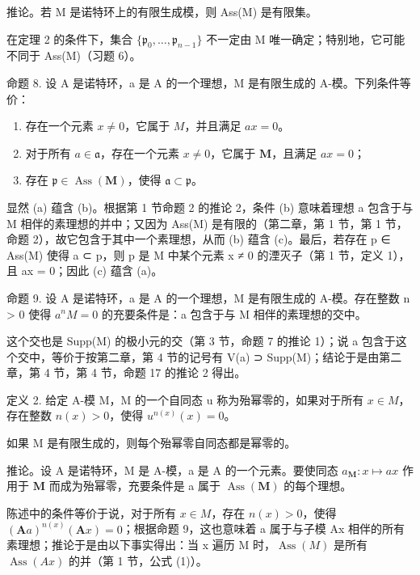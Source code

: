 推论。若 M 是诺特环上的有限生成模，则 Ass(M) 是有限集。

在定理 2 的条件下，集合 \(\{\mathfrak{p}_0,\ldots ,\mathfrak{p}_{n - 1}\}\) 不一定由 M 唯一确定；特别地，它可能不同于 Ass(M)（习题 6）。

命题 8. 设 A 是诺特环，a 是 A 的一个理想，M 是有限生成的 A-模。下列条件等价：

\begin{enumerate}
\def\labelenumi{(\alph{enumi})}
\item
存在一个元素 \(x \neq 0\)，它属于 \(M\)，并且满足 \(ax = 0\)。
\item
对于所有 \(a \in \mathfrak{a}\)，存在一个元素 \(x \neq 0\)，它属于 \(\mathbf{M}\)，且满足 \(ax = 0\)；
\item
  存在 \(\mathfrak{p} \in \operatorname{Ass}(\mathbf{M})\)，使得 \(\mathfrak{a} \subset \mathfrak{p}\)。
\end{enumerate}

显然 (a) 蕴含 (b)。根据第 1 节命题 2 的推论 2，条件 (b) 意味着理想 a 包含于与 M 相伴的素理想的并中；又因为 Ass(M) 是有限的（第二章，第 1 节，第 1 节，命题 2），故它包含于其中一个素理想，从而 (b) 蕴含 (c)。最后，若存在 p ∈ Ass(M) 使得 a ⊂ p，则 p 是 M 中某个元素 x ≠ 0 的湮灭子（第 1 节，定义 1），且 ax = 0；因此 (c) 蕴含 (a)。

命题 9. 设 A 是诺特环，a 是 A 的一个理想，M 是有限生成的 A-模。存在整数 n \textgreater{} 0 使得 \(a^{n}M = 0\) 的充要条件是：a 包含于与 M 相伴的素理想的交中。

这个交也是 Supp(M) 的极小元的交（第 3 节，命题 7 的推论 1）；说 a 包含于这个交中，等价于按第二章，第 4 节的记号有 V(a) ⊃ Supp(M)；结论于是由第二章，第 4 节，第 4 节，命题 17 的推论 2 得出。

定义 2. 给定 A-模 M，M 的一个自同态 u 称为殆幂零的，如果对于所有 \(x \in M\)，存在整数 \(n(x) > 0\)，使得 \(u^{n(x)}(x) = 0\)。

如果 M 是有限生成的，则每个殆幂零自同态都是幂零的。

推论。设 A 是诺特环，M 是 A-模，a 是 A 的一个元素。要使同态 \(a_{\mathbf{M}}: x \mapsto ax\) 作用于 \(\mathbf{M}\) 而成为殆幂零，充要条件是 a 属于 \(\operatorname{Ass}(\mathbf{M})\) 的每个理想。

陈述中的条件等价于说，对于所有 \(x \in M\)，存在 \(n(x) > 0\)，使得 \((\mathbf{A}a)^{n(x)}(\mathbf{A}x) = 0\)；根据命题 9，这也意味着 a 属于与子模 Ax 相伴的所有素理想；推论于是由以下事实得出：当 x 遍历 M 时，\(\operatorname{Ass}(M)\) 是所有 \(\operatorname{Ass}(Ax)\) 的并（第 1 节，公式 (1)）。

